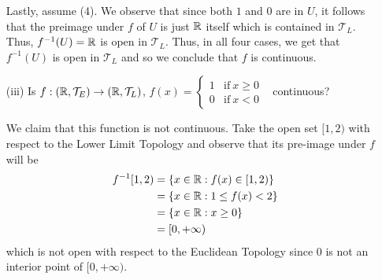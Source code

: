 \documentclass[a4paper]{article}
\begin{document}
\begin{problem}
\begin{enumerate}
\begin{solution}
           Lastly, assume (4). We observe that since both \( 1  \) and \( 0  \) are in \( U  \), it follows that the preimage under \( f  \) of \( U  \) is just \( \R  \) itself which is contained in \( \mathcal{T}_L \). Thus, \( f^{-1}(U) = \R  \) is open in \( {\mathcal{T}}_{L} \).
           Thus, in all four cases, we get that \( f^{-1}(U) \) is open in \( \mathcal{T}_{L} \) and so we conclude that \( f \) is continuous.
       \end{solution}
   \item[(iii)] Is \( f: (\mathbb{R}, {\mathcal{T}}_{E}) \to (\mathbb{R}, {\mathcal{T}}_{L}) \), \( f(x) = 
   \begin{cases}
       1 &\text{if} \ x \geq 0 \\
       0 & \text{if} \ x < 0
   \end{cases}  \) \ continuous?
   \begin{solution}
       We claim that this function is not continuous. Take the open set \( [1,2) \) with respect to the Lower Limit Topology and observe that its pre-image under \( f  \) will be  
       \begin{align*}
           f^{-1}[1,2) &= \{ x \in \mathbb{R} : f(x) \in [1,2) \}  \\
                       &= \{ x \in \mathbb{R} : 1 \leq f(x) < 2  \}  \\
                       &= \{ x \in \mathbb{R} : x \geq 0  \} \\
                       &= [0,+\infty)
       \end{align*}
       which is not open with respect to the Euclidean Topology since \( 0  \) is not an interior point of \( [0,+\infty ) \).
   \end{solution}
   \end{enumerate} 
\end{problem}
\end{document}
